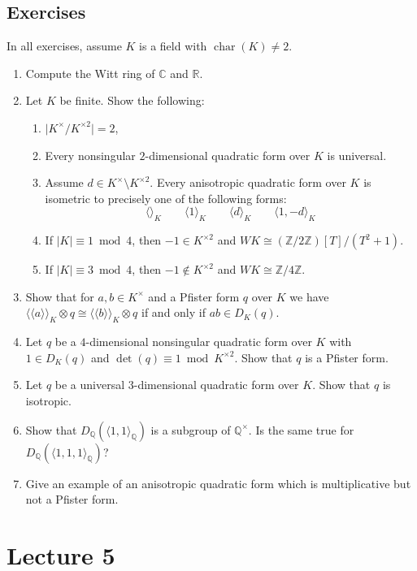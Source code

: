 \documentclass[12pt, leqno, british]{amsart}
\theoremstyle{definition}
\theoremstyle{plain}
\theoremstyle{remark}
\newcommand{\mbb}{\mathbb}
\newcommand{\cc}{\mathbb C}
\newcommand{\rr}{\mathbb R}
\newcommand{\qq}{\mbb Q}
\newcommand{\zz}{\mbb Z}
\DeclareMathOperator{\charac}{char}
\newcommand{\llangle}{\langle\!\langle}
\newcommand{\rrangle}{\rangle\!\rangle}
\begin{document}
\subsection{Exercises}\label{Exercises-L4}
In all exercises, assume $K$ is a field with $\charac(K) \neq 2$.
\begin{enumerate}
\item Compute the Witt ring of $\cc$ and $\rr$.
\item Let $K$ be finite.
Show the following:
\begin{enumerate}
\item $\lvert K^\times / K^{\times 2} \rvert = 2$,
\item Every nonsingular $2$-dimensional quadratic form over $K$ is universal.
\item Assume $d \in K^\times \setminus K^{\times 2}$.
Every anisotropic quadratic form over $K$ is isometric to precisely one of the following forms:
\begin{displaymath}
\langle \rangle_K \qquad \langle 1 \rangle_K \qquad \langle d \rangle_K \qquad \langle 1, -d \rangle_K
\end{displaymath}
\item If $\lvert K \rvert \equiv 1 \bmod 4$, then $-1 \in K^{\times 2}$ and $WK \cong (\zz/2\zz)[T]/(T^2 + 1)$.
\item If $\lvert K \rvert \equiv 3 \bmod 4$, then $-1 \not\in K^{\times 2}$ and $WK \cong \zz/4\zz$.
\end{enumerate}
\item
Show that for $a, b \in K^\times$ and a Pfister form $q$ over $K$ we have $\llangle a \rrangle_K \otimes q \cong \llangle b \rrangle_K \otimes q$ if and only if $ab \in D_K(q)$.
\item\label{ex:4-dim-Pfister} Let $q$ be a $4$-dimensional nonsingular quadratic form over $K$ with $1 \in D_K(q)$ and $\det(q) \equiv 1 \bmod K^{\times 2}$.
Show that $q$ is a Pfister form.
\item Let $q$ be a universal $3$-dimensional quadratic form over $K$.
Show that $q$ is isotropic.
\item Show that $D_\qq(\langle 1, 1 \rangle_\qq)$ is a subgroup of $\qq^\times$.
Is the same true for $D_\qq(\langle 1, 1, 1 \rangle_\qq)$?
\item Give an example of an anisotropic quadratic form which is multiplicative but not a Pfister form.
\end{enumerate}

\section{Lecture 5}
\end{document}
